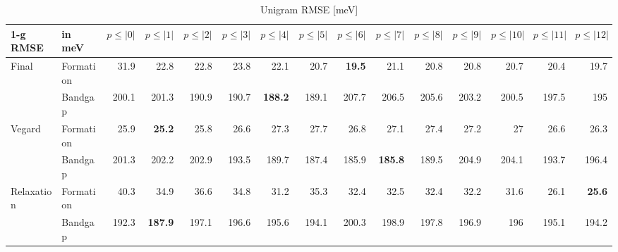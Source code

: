 \documentclass[11pt,oneside,czech,american]{book} %
\theoremstyle{definition} %
\theoremstyle{definition}
\begin{document}
\begin{table}[H]
	\scriptsize
	\centering
\begin{tabular}{llrrrrrrrrrrrrr}
	\hline
	1-g RMSE   & in meV    &   $p{\leq}|0|$ &   $p{\leq}|1|$ &   $p{\leq}|2|$ &   $p{\leq}|3|$ &   $p{\leq}|4|$ &   $p{\leq}|5|$ &   $p{\leq}|6|$ &   $p{\leq}|7|$ &   $p{\leq}|8|$ &   $p{\leq}|9|$ &   $p{\leq}|10|$ &   $p{\leq}|11|$ &   $p{\leq}|12|$ \\
	\hline
	\multirow{2}{*}{Final}      & Formation &       31.9 &       22.8 &       22.8 &       23.8 &       22.1 &       20.7 &       \textbf{19.5} &       21.1 &       20.8 &       20.8 &        20.7 &        20.4 &        19.7 \\
	      & Bandgap   &      200.1 &      201.3 &      190.9 &      190.7 &      \textbf{188.2} &      189.1 &      207.7 &      206.5 &      205.6 &      203.2 &       200.5 &       197.5 &       195   \\
	\multirow{2}{*}{Vegard}     & Formation &       25.9 &       \textbf{25.2} &       25.8 &       26.6 &       27.3 &       27.7 &       26.8 &       27.1 &       27.4 &       27.2 &        27   &        26.6 &        26.3 \\
	     & Bandgap   &      201.3 &      202.2 &      202.9 &      193.5 &      189.7 &      187.4 &      185.9 &      \textbf{185.8} &      189.5 &      204.9 &       204.1 &       193.7 &       196.4 \\
	\multirow{2}{*}{Relaxation} & Formation &       40.3 &       34.9 &       36.6 &       34.8 &       31.2 &       35.3 &       32.4 &       32.5 &       32.4 &       32.2 &        31.6 &        26.1 &        \textbf{25.6} \\
	 & Bandgap   &      192.3 &      \textbf{187.9} &      197.1 &      196.6 &      195.6 &      194.1 &      200.3 &      198.9 &      197.8 &      196.9 &       196   &       195.1 &       194.2 \\
	\hline
\end{tabular}
	\caption{Unigram RMSE [meV]}
	\label{1-g RMSE hat}
\end{table}
\end{document}
